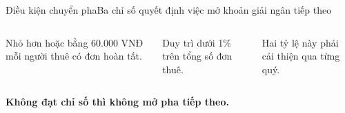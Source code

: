 \begin{frame}{Điều kiện chuyển pha}{Ba chỉ số quyết định việc mở khoản giải ngân tiếp theo}
  \vspace{1.2em}
  \begin{columns}[T,onlytextwidth]
      \par\vspace{.45em}
      Nhỏ hơn hoặc bằng 60.000 VNĐ mỗi người thuê có đơn hoàn tất.
      \par\vspace{.45em}
      Duy trì dưới 1\% trên tổng số đơn thuê.
      \par\vspace{.45em}
      Hai tỷ lệ này phải cải thiện qua từng quý.
  \end{columns}
  \vfill
  \centering\textcolor{mutuxOrange}{\textbf{Không đạt chỉ số thì không mở pha tiếp theo.}}
\end{frame}
